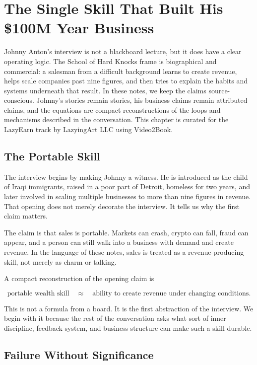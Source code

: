 \chapter{The Single Skill That Built His \$100M Year Business}

Johnny Anton's interview is not a blackboard lecture, but it does have a clear operating logic. The School of Hard Knocks frame is biographical and commercial: a salesman from a difficult background learns to create revenue, helps scale companies past nine figures, and then tries to explain the habits and systems underneath that result. In these notes, we keep the claims source-conscious. Johnny's stories remain stories, his business claims remain attributed claims, and the equations are compact reconstructions of the loops and mechanisms described in the conversation. This chapter is curated for the LazyEarn track by LazyingArt LLC using Video2Book.

\section{The Portable Skill}

The interview begins by making Johnny a witness. He is introduced as the child of Iraqi immigrants, raised in a poor part of Detroit, homeless for two years, and later involved in scaling multiple businesses to more than nine figures in revenue. That opening does not merely decorate the interview. It tells us why the first claim matters.

The claim is that sales is portable. Markets can crash, crypto can fall, fraud can appear, and a person can still walk into a business with demand and create revenue. In the language of these notes, sales is treated as a revenue-producing skill, not merely as charm or talking.

A compact reconstruction of the opening claim is

\begin{equation}
\text{portable wealth skill}
\quad \approx \quad
\text{ability to create revenue under changing conditions}.
\end{equation}

This is not a formula from a board. It is the first abstraction of the interview. We begin with it because the rest of the conversation asks what sort of inner discipline, feedback system, and business structure can make such a skill durable.

\section{Failure Without Significance}

